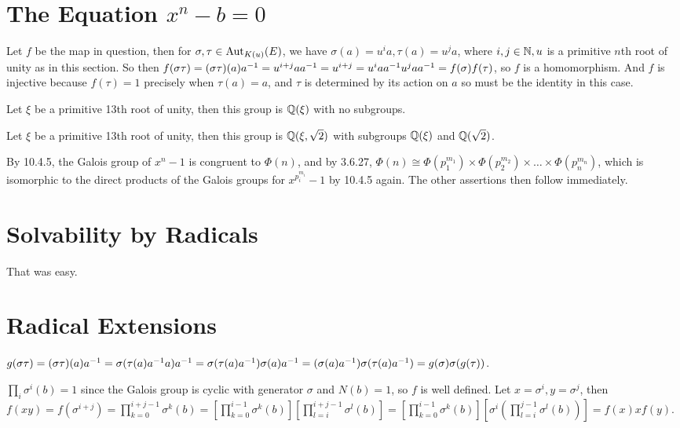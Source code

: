 \documentclass[11pt, oneside]{article}   	%
\begin{document}
\section{The Equation $x^n - b = 0$}
\be
\item Let $f$ be the map in question, then for $\sigma, \tau \in \text{Aut}_{K(u)}(E)$, we have $\sigma(a) = u^ia, \tau(a) = u^ja$, where $i,j \in \mathbb{N}, u$ is a primitive $n$th root of unity as in this section. So then $f(\sigma\tau) = (\sigma\tau)(a)a^{-1} = u^{i+j}aa^{-1} = u^{i+j} = u^iaa^{-1} u^jaa^{-1} = f(\sigma)f(\tau)$, so $f$ is a homomorphism. And $f$ is injective because $f(\tau) = 1$ precisely when $\tau(a) = a$, and $\tau$ is determined by its action on $a$ so must be the identity in this case.
\item Let $\xi$ be a primitive 13th root of unity, then this group is $\mathbb{Q}(\xi)$ with no subgroups.
\item Let $\xi$ be a primitive 13th root of unity, then this group is $\mathbb{Q}(\xi, \sqrt{2})$ with subgroups $\mathbb{Q}(\xi)$ and $\mathbb{Q}(\sqrt{2})$.
\item By 10.4.5, the Galois group of $x^n-1$ is congruent to $\Phi(n)$, and by 3.6.27, $\Phi(n) \cong \Phi(p_1^{m_1}) \times \Phi(p_2^{m_2}) \times \ldots \times \Phi(p_n^{m_n})$, which is isomorphic to the direct products of the Galois groups for $x^{p_i^{m_i}} - 1$ by 10.4.5 again. The other assertions then follow immediately.
\ee
\section{Solvability by Radicals}
That was easy.
\section{Radical Extensions}
\be
\item $g(\sigma\tau) = (\sigma\tau)(a)a^{-1} = \sigma(\tau(a)a^{-1} a)a^{-1} = \sigma(\tau(a)a^{-1})\sigma(a)a^{-1} = (\sigma(a)a^{-1})\sigma(\tau(a)a^{-1}) = g(\sigma)\sigma(g(\tau))$.
\item $\prod_i\sigma^i(b) = 1$ since the Galois group is cyclic with generator $\sigma$ and $N(b) = 1$, so $f$ is well defined. Let $x = \sigma^i, y = \sigma^j$, then $f(xy) = f(\sigma^{i+j}) = \prod_{k=0}^{i+j-1}\sigma^k(b) = [\prod_{k=0}^{i-1}\sigma^k(b)][\prod_{l=i}^{i+j-1}\sigma^l(b)] = [\prod_{k=0}^{i-1}\sigma^k(b)][\sigma^i(\prod_{l=i}^{j-1}\sigma^l(b))]= f(x)xf(y)$.
\ee
\end{document}
